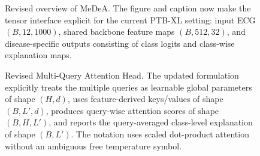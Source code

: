 \documentclass[11pt]{article}
\begin{document}
\begin{figure}[htbp]
\centering
{}
\caption{Revised overview of MeDeA. The figure and caption now make the tensor interface explicit for the current PTB-XL setting: input ECG $(B,12,1000)$, shared backbone feature maps $(B,512,32)$, and disease-specific outputs consisting of class logits and class-wise explanation maps.}
\label{fig:architecture}
\end{figure}

\begin{figure}[htbp]
\centering
{}
\caption{Revised Multi-Query Attention Head. The updated formulation explicitly treats the multiple queries as learnable global parameters of shape $(H,d)$, uses feature-derived keys/values of shape $(B,L',d)$, produces query-wise attention scores of shape $(B,H,L')$, and reports the query-averaged class-level explanation of shape $(B,L')$. The notation uses scaled dot-product attention without an ambiguous free temperature symbol.}
\label{fig:mqah}
\end{figure}
\end{document}
